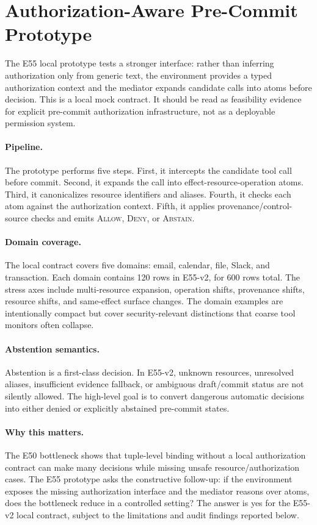 \section{Authorization-Aware Pre-Commit Prototype}



The E55 local prototype tests a stronger interface: rather than inferring authorization only from generic text, the environment provides a typed authorization context and the mediator expands candidate calls into atoms before decision. This is a local mock contract. It should be read as feasibility evidence for explicit pre-commit authorization infrastructure, not as a deployable permission system.

\paragraph{Pipeline.}
The prototype performs five steps. First, it intercepts the candidate tool call before commit. Second, it expands the call into effect-resource-operation atoms. Third, it canonicalizes resource identifiers and aliases. Fourth, it checks each atom against the authorization context. Fifth, it applies provenance/control-source checks and emits \textsc{Allow}, \textsc{Deny}, or \textsc{Abstain}.

\paragraph{Domain coverage.}
The local contract covers five domains: email, calendar, file, Slack, and transaction. Each domain contains 120 rows in E55-v2, for 600 rows total. The stress axes include multi-resource expansion, operation shifts, provenance shifts, resource shifts, and same-effect surface changes. The domain examples are intentionally compact but cover security-relevant distinctions that coarse tool monitors often collapse.

\paragraph{Abstention semantics.}
Abstention is a first-class decision. In E55-v2, unknown resources, unresolved aliases, insufficient evidence fallback, or ambiguous draft/commit status are not silently allowed. The high-level goal is to convert dangerous automatic decisions into either denied or explicitly abstained pre-commit states.

\paragraph{Why this matters.}
The E50 bottleneck shows that tuple-level binding without a local authorization contract can make many decisions while missing unsafe resource/authorization cases. The E55 prototype asks the constructive follow-up: if the environment exposes the missing authorization interface and the mediator reasons over atoms, does the bottleneck reduce in a controlled setting? The answer is yes for the E55-v2 local contract, subject to the limitations and audit findings reported below.
